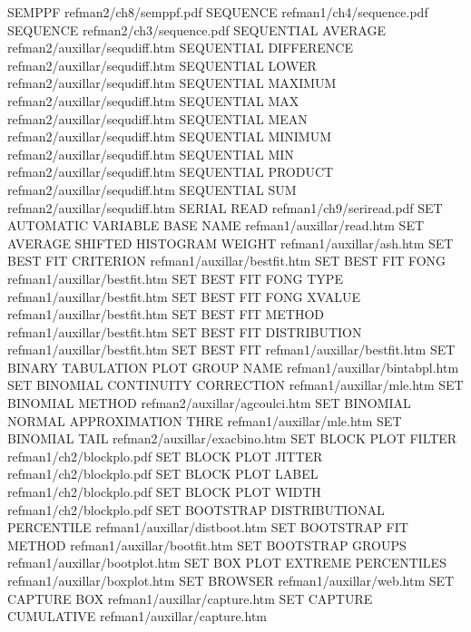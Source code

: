 SEMPPF                                  refman2/ch8/semppf.pdf
SEQUENCE                                refman1/ch4/sequence.pdf
SEQUENCE                                refman2/ch3/sequence.pdf
SEQUENTIAL AVERAGE                      refman2/auxillar/sequdiff.htm
SEQUENTIAL DIFFERENCE                   refman2/auxillar/sequdiff.htm
SEQUENTIAL LOWER                        refman2/auxillar/sequdiff.htm
SEQUENTIAL MAXIMUM                      refman2/auxillar/sequdiff.htm
SEQUENTIAL MAX                          refman2/auxillar/sequdiff.htm
SEQUENTIAL MEAN                         refman2/auxillar/sequdiff.htm
SEQUENTIAL MINIMUM                      refman2/auxillar/sequdiff.htm
SEQUENTIAL MIN                          refman2/auxillar/sequdiff.htm
SEQUENTIAL PRODUCT                      refman2/auxillar/sequdiff.htm
SEQUENTIAL SUM                          refman2/auxillar/sequdiff.htm
SERIAL READ                             refman1/ch9/seriread.pdf
SET AUTOMATIC VARIABLE BASE NAME        refman1/auxillar/read.htm
SET AVERAGE SHIFTED HISTOGRAM WEIGHT    refman1/auxillar/ash.htm
SET BEST FIT CRITERION                  refman1/auxillar/bestfit.htm
SET BEST FIT FONG                       refman1/auxillar/bestfit.htm
SET BEST FIT FONG TYPE                  refman1/auxillar/bestfit.htm
SET BEST FIT FONG XVALUE                refman1/auxillar/bestfit.htm
SET BEST FIT METHOD                     refman1/auxillar/bestfit.htm
SET BEST FIT DISTRIBUTION               refman1/auxillar/bestfit.htm
SET BEST FIT                            refman1/auxillar/bestfit.htm
SET BINARY TABULATION PLOT GROUP NAME   refman1/auxillar/bintabpl.htm
SET BINOMIAL CONTINUITY CORRECTION      refman1/auxillar/mle.htm
SET BINOMIAL METHOD                     refman2/auxillar/agcoulci.htm
SET BINOMIAL NORMAL APPROXIMATION THRE  refman1/auxillar/mle.htm
SET BINOMIAL TAIL                       refman2/auxillar/exacbino.htm
SET BLOCK PLOT FILTER                   refman1/ch2/blockplo.pdf
SET BLOCK PLOT JITTER                   refman1/ch2/blockplo.pdf
SET BLOCK PLOT LABEL                    refman1/ch2/blockplo.pdf
SET BLOCK PLOT WIDTH                    refman1/ch2/blockplo.pdf
SET BOOTSTRAP DISTRIBUTIONAL PERCENTILE refman1/auxillar/distboot.htm
SET BOOTSTRAP FIT METHOD                refman1/auxillar/bootfit.htm
SET BOOTSTRAP GROUPS                    refman1/auxillar/bootplot.htm
SET BOX PLOT EXTREME PERCENTILES        refman1/auxillar/boxplot.htm
SET BROWSER                             refman1/auxillar/web.htm
SET CAPTURE BOX                         refman1/auxillar/capture.htm
SET CAPTURE CUMULATIVE                  refman1/auxillar/capture.htm
